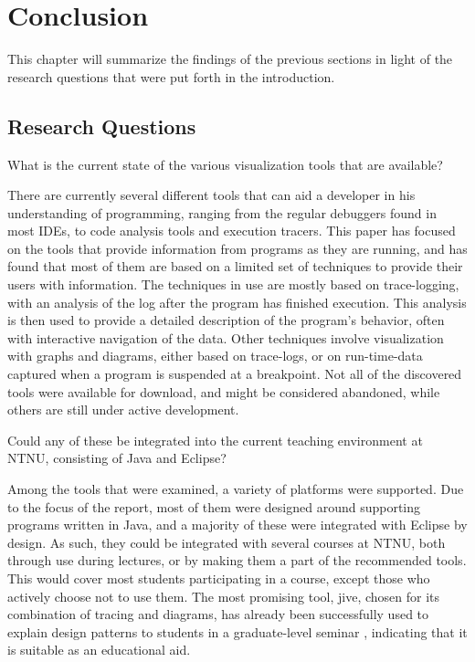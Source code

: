 \chapter{Conclusion}\label{conclusion}

This chapter will summarize the findings of the previous sections in light of the research questions that were put forth in the introduction.

\section{Research Questions}\label{conclusionRQs}

\begin{theorem}
What is the current state of the various visualization tools that are available?
\end{theorem}
There are currently several different tools that can aid a developer in his understanding of programming, ranging from the regular debuggers found in most IDEs, to code analysis tools and execution tracers.
This paper has focused on the tools that provide information from programs as they are running, and has found that most of them are based on a limited set of techniques to provide their users with information.
The techniques in use are mostly based on trace-logging, with an analysis of the log after the program has finished execution.
This analysis is then used to provide a detailed description of the program's behavior, often with interactive navigation of the data.
Other techniques involve visualization with graphs and diagrams, either based on trace-logs, or on run-time-data captured when a program is suspended at a breakpoint.
Not all of the discovered tools were available for download, and might be considered abandoned, while others are still under active development.

\begin{theorem}
Could any of these be integrated into the current teaching environment at NTNU, consisting of Java and Eclipse?
\end{theorem}
Among the tools that were examined, a variety of platforms were supported.
Due to the focus of the report, most of them were designed around supporting programs written in Java, and a majority of these were integrated with Eclipse by design.
As such, they could be integrated with several courses at NTNU, both through use during lectures, or by making them a part of the recommended tools.
This would cover most students participating in a course, except those who actively choose not to use them.
The most promising tool, \gls{jive}, chosen for its combination of tracing and diagrams, has already been successfully used to explain design patterns to students in a graduate-level seminar \cite[p. 99]{Gestwicki2005}, indicating that it is suitable as an educational aid.

